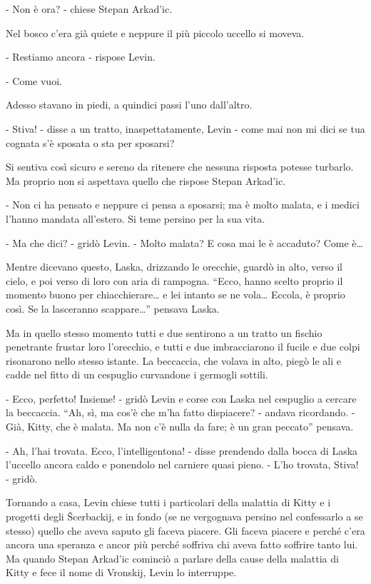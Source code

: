 - Non è ora? - chiese Stepan Arkad'ic. 

Nel bosco c'era già quiete e neppure il più piccolo uccello si moveva. 

- Restiamo ancora - rispose Levin. 

- Come vuoi. 

Adesso stavano in piedi, a quindici passi l'uno dall'altro. 

- Stiva! - disse a un tratto, inaspettatamente, Levin - come mai non mi dici se tua cognata s'è sposata o sta per sposarsi? 

Si sentiva così sicuro e sereno da ritenere che nessuna risposta potesse turbarlo. Ma proprio non si aspettava quello che rispose Stepan Arkad'ic. 

- Non ci ha pensato e neppure ci pensa a sposarsi; ma è molto malata, e i medici l'hanno mandata all'estero. Si teme persino per la sua vita. 

- Ma che dici? - gridò Levin. - Molto malata? E cosa mai le è accaduto? Come è\ldots{} 

Mentre dicevano questo, Laska, drizzando le orecchie, guardò in alto, verso il cielo, e poi verso di loro con aria di rampogna. ``Ecco, hanno scelto proprio il momento buono per chiacchierare\ldots{} e lei intanto se ne vola\ldots{} Eccola, è proprio così. Se la lasceranno scappare\ldots{}'' pensava Laska. 

Ma in quello stesso momento tutti e due sentirono a un tratto un fischio penetrante frustar loro l'orecchio, e tutti e due imbracciarono il fucile e due colpi risonarono nello stesso istante. La beccaccia, che volava in alto, piegò le ali e cadde nel fitto di un cespuglio curvandone i germogli sottili. 

- Ecco, perfetto! Insieme! - gridò Levin e corse con Laska nel cespuglio a cercare la beccaccia. ``Ah, sì, ma cos'è che m'ha fatto dispiacere? - andava ricordando. - Già, Kitty, che è malata. Ma non c'è nulla da fare; è un gran peccato'' pensava. 

- Ah, l'hai trovata. Ecco, l'intelligentona! - disse prendendo dalla bocca di Laska l'uccello ancora caldo e ponendolo nel carniere quasi pieno. - L'ho trovata, Stiva! - gridò. 

Tornando a casa, Levin chiese tutti i particolari della malattia di Kitty e i progetti degli Šcerbackij, e in fondo (se ne vergognava persino nel confessarlo a se stesso) quello che aveva saputo gli faceva piacere. Gli faceva piacere e perché c'era ancora una speranza e ancor più perché soffriva chi aveva fatto soffrire tanto lui. Ma quando Stepan Arkad'ic cominciò a parlare della cause della malattia di Kitty e fece il nome di Vronskij, Levin lo interruppe. 

